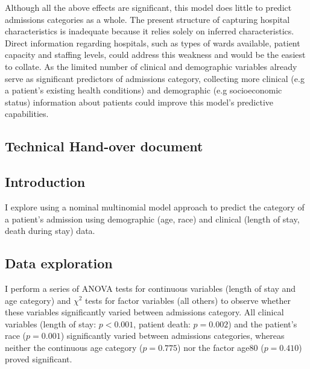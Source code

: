 \documentclass[11pt]{article}
\begin{document}
Although all the above effects are significant, this model does little to predict admissions categories as a whole.  The present structure of capturing hospital characteristics is inadequate because it relies solely on inferred characteristics. Direct information regarding hospitals, such as types of wards available, patient capacity and staffing levels, could address this weakness and would be the easiest to collate. As the limited number of clinical and demographic variables already serve as significant predictors of admissions category, collecting more clinical (e.g a patient's existing health conditions) and demographic (e.g socioeconomic status) information about patients could improve this model's predictive capabilities. 





\newpage
\begin{center}
\section*{
    Technical Hand-over document
}
\end{center}

\subsection*{
    \vspace{-0.25cm}
    Introduction
}
I explore using a nominal multinomial model approach to predict the category of a patient's admission using demographic (age, race) and clinical (length of stay, death during stay) data.


\vspace{-0.5cm}
\subsection*{
    \vspace{-0.25cm}
    Data exploration
}
I perform a series of ANOVA tests for continuous variables (length of stay and age category) and $\chi^2$ tests for factor variables (all others) to observe whether these variables significantly varied between admissions category. All clinical variables (length of stay: $p < 0.001$, patient death: $p = 0.002$) and the patient's race ($p = 0.001$) significantly varied between admissions categories, whereas neither the continuous age category ($p = 0.775$) nor the factor age80 ($p = 0.410$) proved significant.
\end{document}

